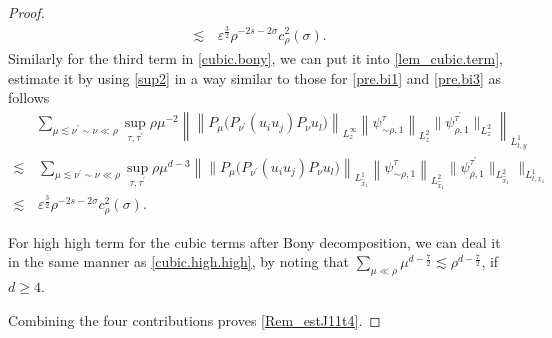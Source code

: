 \documentclass[11pt,letterpaper,reqno]{amsart}
\numberwithin{equation}{section}
\theoremstyle{definition}
\theoremstyle{remark}
\begin{document}
\begin{proof}
\begin{align*}
  \lesssim &\, \varepsilon^{\frac 32} \rho^{-2s -2\sigma}  c_{\rho }^2 (\sigma).
\end{align*}
Similarly for the third term in \eqref{cubic.bony}, we can put it into  \eqref{lem_cubic.term},  estimate it by using \eqref{sup2} in a way similar  to those for  \eqref{pre.bi1} and \eqref{pre.bi3}  as follows 
\begin{align*}
      &  \sum_{ \mu \lesssim \nu^\prime \sim \nu  \ll \rho} 	\sup_{\tau, \tau^\prime }  \rho \mu^{-2}\left\| \left\| 	 P_\mu \big(P_{\nu^\prime } (u_i u_j )P_{\nu}   u_l\big)\right\|_{L^\infty_z} \left\|     \psi_{\sim\rho ,1}^{\tau } \right\|_{L^2_z}    \|   \psi_{\rho,1} ^{\tau^\prime} \|_{L^2_z}     \right\|_{L^1_{t,y}}\nonumber \\
      \lesssim &\, \sum_{ \mu \lesssim \nu^\prime \sim \nu  \ll \rho} 	\sup_{\tau, \tau^\prime }  \rho \mu^{d-3}\left\| \big\| 	 P_\mu \big(P_{\nu^\prime } (u_i u_j )P_{\nu}   u_l\big)\right\|_{L^1_{\widehat{x}_1}} \left\|     \psi_{\sim\rho ,1}^{\tau } \right\|_{L^2_{\widehat{x}_1}}    \|   \psi_{\rho,1} ^{\tau^\prime} \|_{L^2_{\widehat{x}_1}}     \big\|_{L^1_{t,x_1}} \\
      \lesssim &\,\varepsilon^{\frac 32} \rho^{-2s -2\sigma}  c_{\rho }^2 (\sigma).
\end{align*}

For high high term   for the cubic terms after Bony decomposition, we can deal it in the same manner as \eqref{cubic.high.high}, by noting that \(\sum_{\mu\ll\rho} \mu^{d-\frac 72} \lesssim \rho^{d-\frac 72} \), if \(d \geq 4\).


Combining the four
contributions proves \eqref{Rem_estJ11t4}.


 
\end{proof}
\end{document}
